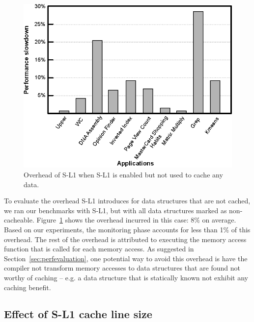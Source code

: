 \begin{figure}[t]
\center
\includegraphics[scale=0.82]{7cachingOverhead.eps}
\vspace{-0.0cm}
\caption{\footnotesize\textnormal{Overhead of S-L1 when S-L1 is enabled but not used to cache any data.}}
\label{fig:sl1overhead}
\end{figure}

To evaluate the overhead S-L1 introduces for data structures that are not cached, we ran our benchmarks with S-L1, but with all data structures marked as non-cacheable.
Figure~\ref{fig:sl1overhead} shows the overhead incurred in this case: 8\% on average.
Based on our experiments, the monitoring phase accounts for less than 1\% of this overhead. 
The rest of the overhead is attributed to executing the memory access function that is called for each memory access.
As suggested in Section~\ref{sec:perfevaluation}, one potential way to avoid this overhead is have the compiler not
transform memory accesses to data structures that are found not worthy of caching -- e.g. a data
structure that is statically known not exhibit any caching benefit.


\subsection{Effect of S-L1 cache line size}
\label{sec:cachelineeffect}



